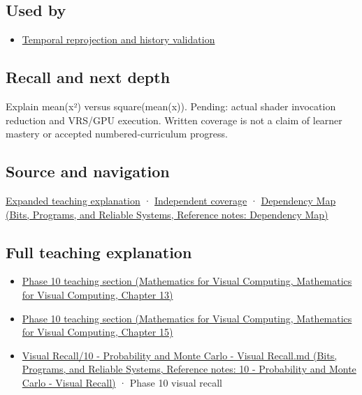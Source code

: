 \subsection{Used by}\label{appendix-4192b2bdd21e-used-by}

\begin{itemize}
\tightlist
\item
  \hyperref[appendix-0727340a4428]{Temporal reprojection and history validation}
\end{itemize}

\subsection{Recall and next depth}\label{appendix-4192b2bdd21e-recall-and-next-depth}

Explain mean(x²) versus square(mean(x)). Pending: actual shader invocation reduction and VRS/GPU execution. Written coverage is not a claim of learner mastery or accepted numbered-curriculum progress.

\subsection{Source and navigation}\label{appendix-4192b2bdd21e-source-and-navigation}

\hyperref[04-visual-computing-ii-ch042-multiresolution-work-must-preserve-the-right-information]{Expanded teaching explanation} · \hyperref[appendix-fd090d982a15-xr01---independent-seeing-and-representation-source]{Independent coverage} · \href{../01-Bits-Programs-and-Reliable-Systems/main.pdf\#nameddest=appendix-4ad47bdd269a}{Dependency Map (Bits, Programs, and Reliable Systems, Reference notes: Dependency Map)}

\subsection{Full teaching explanation}\label{appendix-4192b2bdd21e-full-teaching-explanation}

\begin{itemize}
\tightlist
\item
  \href{../02-Mathematics-for-Visual-Computing/main.pdf\#nameddest=02-foundations-ii-ch029-a-computer-produces-deterministic-pseudorandom-sequences}{Phase 10 teaching section (Mathematics for Visual Computing, Mathematics for Visual Computing, Chapter 13)}
\item
  \href{../02-Mathematics-for-Visual-Computing/main.pdf\#nameddest=02-foundations-ii-ch031-use-probability-to-evaluate-graphics-and-research-claims}{Phase 10 teaching section (Mathematics for Visual Computing, Mathematics for Visual Computing, Chapter 15)}
\item
  \href{../01-Bits-Programs-and-Reliable-Systems/main.pdf\#nameddest=appendix-cb5af353ef77}{Visual Recall/10 - Probability and Monte Carlo - Visual Recall.md (Bits, Programs, and Reliable Systems, Reference notes: 10 - Probability and Monte Carlo - Visual Recall)} · Phase 10 visual recall
\end{itemize}
